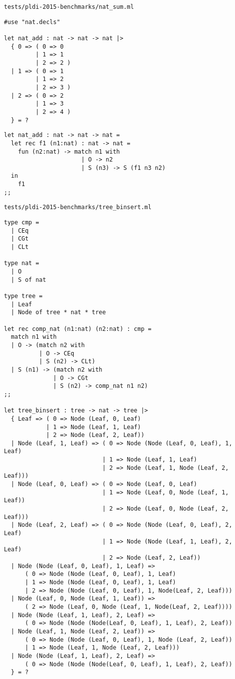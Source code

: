 \noindent\large\texttt{tests/pldi-2015-benchmarks/nat\_sum.ml}
\begin{verbatim}
#use "nat.decls"

let nat_add : nat -> nat -> nat |>
  { 0 => ( 0 => 0
         | 1 => 1
         | 2 => 2 )
  | 1 => ( 0 => 1
         | 1 => 2
         | 2 => 3 )
  | 2 => ( 0 => 2
         | 1 => 3
         | 2 => 4 )
  } = ?
\end{verbatim}

\begin{verbatim}
let nat_add : nat -> nat -> nat =
  let rec f1 (n1:nat) : nat -> nat =
    fun (n2:nat) -> match n1 with
                      | O -> n2
                      | S (n3) -> S (f1 n3 n2)
  in
    f1
;;
\end{verbatim}

\noindent\large\texttt{tests/pldi-2015-benchmarks/tree\_binsert.ml}
\begin{verbatim}
type cmp =
  | CEq
  | CGt
  | CLt

type nat =
  | O
  | S of nat

type tree =
  | Leaf
  | Node of tree * nat * tree

let rec comp_nat (n1:nat) (n2:nat) : cmp =
  match n1 with
  | O -> (match n2 with
          | O -> CEq
          | S (n2) -> CLt)
  | S (n1) -> (match n2 with
              | O -> CGt
              | S (n2) -> comp_nat n1 n2)
;;

let tree_binsert : tree -> nat -> tree |>
  { Leaf => ( 0 => Node (Leaf, 0, Leaf)
            | 1 => Node (Leaf, 1, Leaf)
            | 2 => Node (Leaf, 2, Leaf))
  | Node (Leaf, 1, Leaf) => ( 0 => Node (Node (Leaf, 0, Leaf), 1, Leaf)
                            | 1 => Node (Leaf, 1, Leaf)
                            | 2 => Node (Leaf, 1, Node (Leaf, 2, Leaf)))
  | Node (Leaf, 0, Leaf) => ( 0 => Node (Leaf, 0, Leaf)
                            | 1 => Node (Leaf, 0, Node (Leaf, 1, Leaf))
                            | 2 => Node (Leaf, 0, Node (Leaf, 2, Leaf)))
  | Node (Leaf, 2, Leaf) => ( 0 => Node (Node (Leaf, 0, Leaf), 2, Leaf)
                            | 1 => Node (Node (Leaf, 1, Leaf), 2, Leaf)
                            | 2 => Node (Leaf, 2, Leaf))
  | Node (Node (Leaf, 0, Leaf), 1, Leaf) =>
      ( 0 => Node (Node (Leaf, 0, Leaf), 1, Leaf)
      | 1 => Node (Node (Leaf, 0, Leaf), 1, Leaf)
      | 2 => Node (Node (Leaf, 0, Leaf), 1, Node(Leaf, 2, Leaf)))
  | Node (Leaf, 0, Node (Leaf, 1, Leaf)) =>
      ( 2 => Node (Leaf, 0, Node (Leaf, 1, Node(Leaf, 2, Leaf))))
  | Node (Node (Leaf, 1, Leaf), 2, Leaf) =>
      ( 0 => Node (Node (Node(Leaf, 0, Leaf), 1, Leaf), 2, Leaf))
  | Node (Leaf, 1, Node (Leaf, 2, Leaf)) =>
      ( 0 => Node (Node (Leaf, 0, Leaf), 1, Node (Leaf, 2, Leaf))
      | 1 => Node (Leaf, 1, Node (Leaf, 2, Leaf)))
  | Node (Node (Leaf, 1, Leaf), 2, Leaf) =>
      ( 0 => Node (Node (Node(Leaf, 0, Leaf), 1, Leaf), 2, Leaf))
  } = ?
\end{verbatim}

